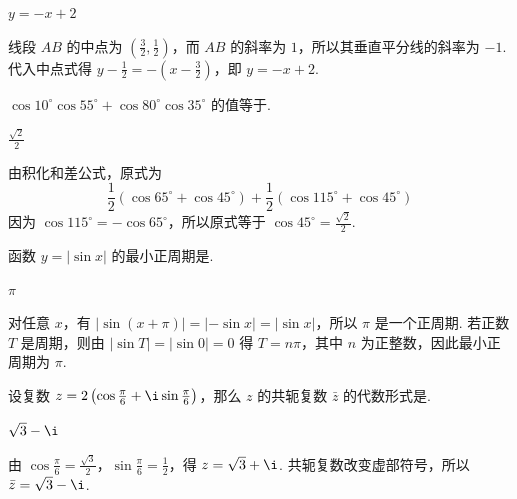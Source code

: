 \documentclass[UTF8,a4paper,oneside,11pt]{ctexbook}
\begin{document}
\begin{answer}
\(y=-x+2\)
\end{answer}

\begin{solution}
线段 \(AB\) 的中点为 \(\left(\frac32,\frac12\right)\)，而 \(AB\) 的斜率为 \(1\)，所以其垂直平分线的斜率为 \(-1\). 代入中点式得 \(y-\frac12=-\left(x-\frac32\right)\)，即 \(y=-x+2\).
\end{solution}

\begin{problem}
\(\cos 10^\circ \cos 55^\circ + \cos 80^\circ \cos 35^\circ\) 的值等于\fillinblank{}.
\end{problem}

\begin{answer}
\(\frac{\sqrt2}{2}\)
\end{answer}

\begin{solution}
由积化和差公式，原式为
\[
\frac12\left(\cos65^\circ+\cos45^\circ\right)+\frac12\left(\cos115^\circ+\cos45^\circ\right)
\]
因为 \(\cos115^\circ=-\cos65^\circ\)，所以原式等于 \(\cos45^\circ=\frac{\sqrt2}{2}\).
\end{solution}

\begin{problem}
函数 \(y = |\sin x|\) 的最小正周期是\fillinblank{}.
\end{problem}

\begin{answer}
\(\pi\)
\end{answer}

\begin{solution}
对任意 \(x\)，有 \(|\sin(x+\pi)|=|{-\sin x}|=|\sin x|\)，所以 \(\pi\) 是一个正周期. 若正数 \(T\) 是周期，则由 \(|\sin T|=|\sin0|=0\) 得 \(T=n\pi\)，其中 \(n\) 为正整数，因此最小正周期为 \(\pi\).
\end{solution}

\begin{problem}
设复数 \(z = 2\left(\cos \frac{\pi}{6} + \i \sin \frac{\pi}{6}\right)\)，那么 \(z\) 的共轭复数 \(\bar{z}\) 的代数形式是\fillinblank{}.
\end{problem}

\begin{answer}
\(\sqrt3-\i\)
\end{answer}

\begin{solution}
由 \(\cos\frac\pi6=\frac{\sqrt3}{2}\)，\(\sin\frac\pi6=\frac12\)，得 \(z=\sqrt3+\i\). 共轭复数改变虚部符号，所以 \(\bar z=\sqrt3-\i\).
\end{solution}
\end{document}
